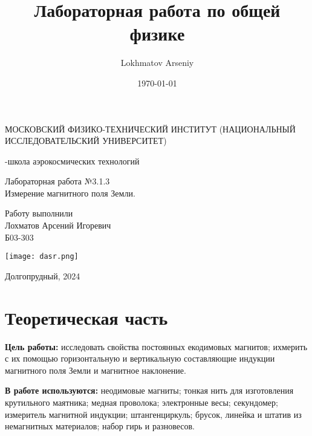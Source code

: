 \documentclass[a4paper,12pt]{article} %
\author{Lokhmatov Arseniy}
\title{Лабораторная работа по общей физике}
\date{\today}
\begin{document}
\begin{titlepage}
    \newpage
    \begin{center}
    {\large МОСКОВСКИЙ ФИЗИКО-ТЕХНИЧЕСКИЙ ИНСТИТУТ (НАЦИОНАЛЬНЫЙ ИССЛЕДОВАТЕЛЬСКИЙ УНИВЕРСИТЕТ)}
    \vspace{1cm}

    {-школа аэрокосмических технологий}
    \vspace{6em}
    \end{center}
    
    \vspace{1.2em}

    \begin{center}
    \Large Лабораторная работа №3.1.3 \\
    Измерение магнитного поля Земли.
    \linebreak
    \end{center}
    
    \vspace{11em}
    
    \begin{flushright}
                       {\large Работу выполнили\\
                       Лохматов Арсений Игоревич\\
                       Б03-303 }
    \end{flushright}

    \vspace{\fill}

    \begin{center}
        \texttt{[image: dasr.png]}
    \end{center}

    \begin{center}
    Долгопрудный, 2024
    \end{center}

    \end{titlepage}

\section{Теоретическая часть}

\textbf{Цель работы:} исследовать свойства постоянных екодимовых магнитов; ихмерить с их помощью горизонтальную и вертикальную составляющие индукции магнитного поля Земли и магнитное наклонение.

\textbf{В работе используются:} неодимовые магниты; тонкая нить для изготовления крутильного маятника; медная проволока; электронные весы; секундомер; измеритель магнитной индукции; штангенциркуль; брусок, линейка и штатив из немагнитных материалов; набор гирь и разновесов.
\end{document}
